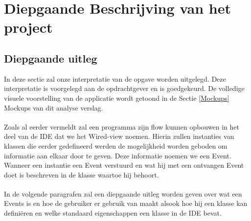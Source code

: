 \documentclass[]{article}
\begin{document}
 
\section{Diepgaande Beschrijving van het project}
\label{beschrijf}
 
\subsection{Diepgaande uitleg}
In deze sectie zal onze interpretatie van de opgave worden uitgelegd. Deze interpretatie is voorgelegd aan de opdrachtgever en is goedgekeurd. De volledige visuele voorstelling van de applicatie wordt getoond in de Sectie \ref{Mockups} Mockups van dit analyse verslag.\\\\
Zoals al eerder vermeldt zal een programma zijn flow kunnen opbouwen in het deel van de IDE dat we het Wired-view noemen. Hierin zullen instanties van klassen die eerder gedefineerd werden de mogelijkheid worden geboden om informatie aan elkaar door te geven. Deze informatie noemen we een Event. Wanneer een instantie een Event verstuurd en wat hij met een ontvangen Event doet is beschreven in de klasse waartoe hij behoort.\\\\ In de volgende paragrafen zal een diepgaande uitleg worden geven over wat een Events is en hoe de gebruiker er gebruik van maakt alsook hoe hij een klasse kan defini\"{e}ren en welke standaard eigenschappen een klasse in de IDE bevat.
\end{document}
